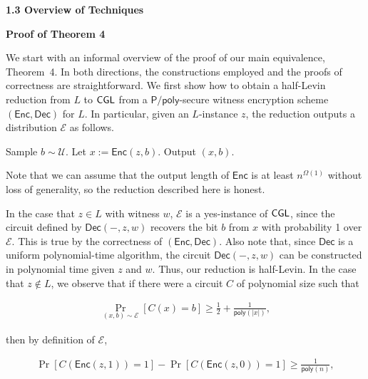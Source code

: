\par\medskip\noindent\textbf{
1.3 Overview of Techniques}\par




\par\medskip\noindent\textbf{Proof of Theorem 4
}\par




We start with an informal overview of the proof of our main equivalence, Theorem 4. In both directions, the constructions employed and the proofs of correctness are straightforward. We first show how to obtain a half-Levin reduction from $L$ to ${\sf CGL}$ from a ${\mathsf{P}}/{\mathsf{poly}}$-secure witness encryption scheme $({\mathsf{Enc}},{\mathsf{Dec}})$ for $L$. In particular, given an $L$-instance $z$, the reduction outputs a distribution $\mathcal{E}$ as follows.\par



Sample $b\sim\mathcal{U}$. Let $x:={\mathsf{Enc}}(z,b)$. Output $(x,b)$.\par



Note that we can assume that the output length of ${\mathsf{Enc}}$ is at least $n^{\Omega(1)}$ without loss of generality, so the reduction described here is honest.\par




In the case that $z\in L$ with witness $w$, $\mathcal{E}$ is a yes-instance of ${\sf CGL}$, since the circuit defined by ${\mathsf{Dec}}(-,z,w)$ recovers the bit $b$ from $x$ with probability 1 over $\mathcal{E}$. This is true by the correctness of $({\mathsf{Enc}},{\mathsf{Dec}})$. Also note that, since ${\mathsf{Dec}}$ is a uniform polynomial-time algorithm, the circuit ${\mathsf{Dec}}(-,z,w)$ can be constructed in polynomial time given $z$ and $w$. Thus, our reduction is half-Levin. In the case that $z\notin L$, we observe that if there were a circuit $C$ of polynomial size such that\par


\[\begin{gathered}
\Pr_{(x,b)\sim\mathcal{E}}[C(x)=b]\geq\frac{1}{2}+\frac{1}{{\mathsf{poly}}(|x|)},
\end{gathered}\]


then by definition of $\mathcal{E}$,\par


\[\begin{gathered}
\Pr[C({\mathsf{Enc}}(z,1))=1]-\Pr[C({\mathsf{Enc}}(z,0))=1]\geq\frac{1}{{\mathsf{poly}}(n)},
\end{gathered}\]



